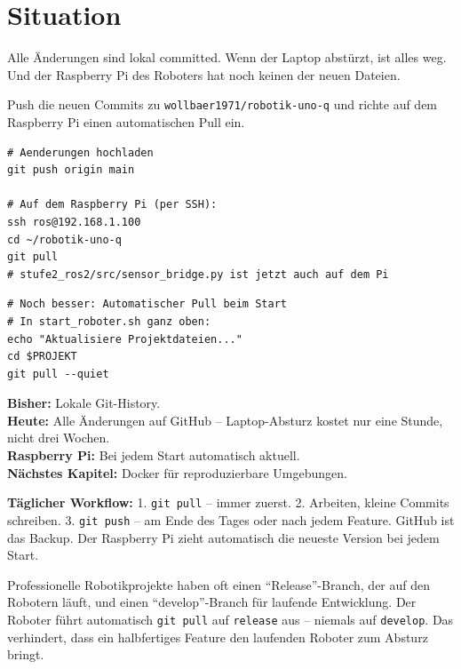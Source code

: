 \kapitelstruktur

\section{Situation}

Alle Änderungen sind lokal committed. Wenn der Laptop
abstürzt, ist alles weg. Und der Raspberry Pi des Roboters
hat noch keinen der neuen Dateien.

\begin{aufgabeBox}
Push die neuen Commits zu \texttt{wollbaer1971/robotik-uno-q}
und richte auf dem Raspberry Pi einen automatischen Pull ein.
\end{aufgabeBox}

\begin{lstlisting}[style=bash]
# Aenderungen hochladen
git push origin main

# Auf dem Raspberry Pi (per SSH):
ssh ros@192.168.1.100
cd ~/robotik-uno-q
git pull
# stufe2_ros2/src/sensor_bridge.py ist jetzt auch auf dem Pi
\end{lstlisting}

\begin{lstlisting}[style=bash]
# Noch besser: Automatischer Pull beim Start
# In start_roboter.sh ganz oben:
echo "Aktualisiere Projektdateien..."
cd $PROJEKT
git pull --quiet
\end{lstlisting}

\begin{projektBox}
\textbf{Bisher:} Lokale Git-History.\\
\textbf{Heute:} Alle Änderungen auf GitHub -- Laptop-Absturz
kostet nur eine Stunde, nicht drei Wochen.\\
\textbf{Raspberry Pi:} Bei jedem Start automatisch aktuell.\\
\textbf{Nächstes Kapitel:} Docker für reproduzierbare Umgebungen.
\end{projektBox}

\begin{merksatzBox}
\textbf{Täglicher Workflow:}
1. \texttt{git pull} -- immer zuerst.
2. Arbeiten, kleine Commits schreiben.
3. \texttt{git push} -- am Ende des Tages oder nach jedem Feature.
GitHub ist das Backup. Der Raspberry Pi zieht automatisch die
neueste Version bei jedem Start.
\end{merksatzBox}

\begin{robotikBox}
Professionelle Robotikprojekte haben oft einen
\enquote{Release}-Branch, der auf den Robotern läuft,
und einen \enquote{develop}-Branch für laufende Entwicklung.
Der Roboter führt automatisch \texttt{git pull} auf
\texttt{release} aus -- niemals auf \texttt{develop}.
Das verhindert, dass ein halbfertiges Feature den
laufenden Roboter zum Absturz bringt.
\end{robotikBox}
